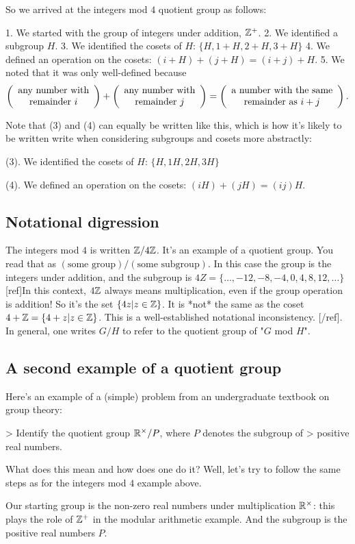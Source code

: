 So we arrived at the integers mod $4$ quotient group as follows:

1. We started with the group of integers under addition, $\mathbb{Z}^+$.
2. We identified a subgroup $H$.
3. We identified the cosets of $H$: $\{H, 1+H, 2+H, 3+H\}$
4. We defined an operation on the cosets: $(i+H) + (j+H) = (i+j)+H$.
5. We noted that it was only well-defined because
  $$
  \left(\begin{array}{c} \text{any number with} \\ \text{remainder $i$} \end{array}\right) +
  \left(\begin{array}{c} \text{any number with} \\ \text{remainder $j$} \end{array}\right) =
  \left(\begin{array}{c} \text{a number with the same} \\ \text{remainder as $i+j$} \end{array}\right).
  $$

Note that (3) and (4) can equally be written like this, which is how it's
likely to be written write when considering subgroups and cosets more
abstractly:

(3). We identified the cosets of $H$: $\{H, 1H, 2H, 3H\}$

(4). We defined an operation on the cosets: $(iH) + (jH) = (ij)H$.


\subsection{Notational digression}

The integers mod $4$ is written $\mathbb{Z}/4\mathbb{Z}$. It's an example of a quotient
group. You read that as $(\text{some group}) / (\text{some subgroup})$. In this
case the group is the integers under addition, and the subgroup is $4Z =
\{\ldots, -12, -8, -4, 0, 4, 8, 12, \ldots\}$[ref]In this context, $4\mathbb{Z}$ always
means multiplication, even if the group operation is addition! So it's the set
$\{4z|z \in \mathbb{Z}\}$. It is *not* the same as the coset $4 + \mathbb{Z} = \{4+z|z \in
\mathbb{Z}\}$. This is a well-established notational inconsistency. [/ref]. In general,
one writes $G/H$ to refer to the quotient group of "$G$ mod $H$".


\subsection{A second example of a quotient group}

Here's an example of a (simple) problem from an undergraduate textbook on group theory:

> Identify the quotient group $\mathbb{R}^\times/P$, where $P$ denotes the subgroup of
> positive real numbers.

What does this mean and how does one do it? Well, let's try to follow the same
steps as for the integers mod $4$ example above.

Our starting group is the non-zero real numbers under multiplication $\mathbb{R}^\times$:
this plays the role of $\mathbb{Z}^+$ in the modular arithmetic example. And the
subgroup is the positive real numbers $P$.

